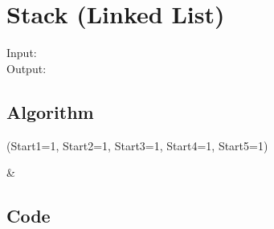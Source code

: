 \documentclass[ProgramminAssignment.tex]{subfiles}
\begin{document}
\section{Stack (Linked List)}


Input:\\


Output:\\


\subsection{Algorithm}
\begin{easylist}
\ListProperties(Start1=1, Start2=1, Start3=1, Start4=1, Start5=1)

	& 

\end{easylist}

\subsection{Code}
\begin{lstlisting}

\end{lstlisting}
\end{document}
